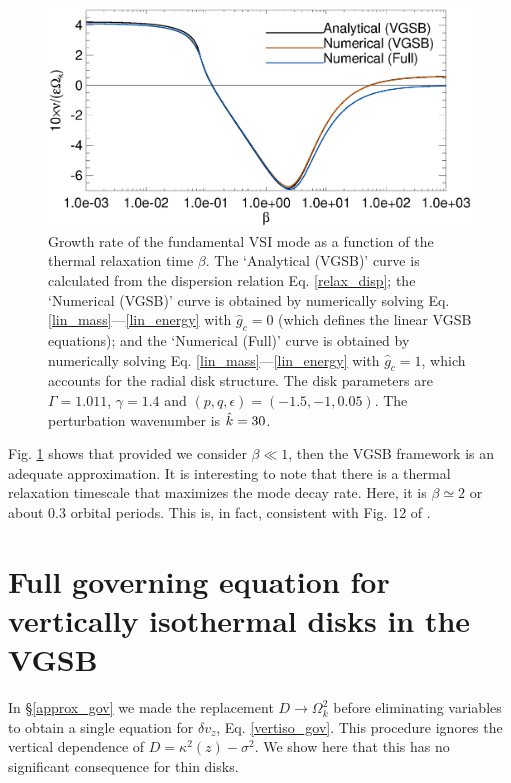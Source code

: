 \begin{figure}
  \includegraphics[width=\linewidth,clip=true,trim=0cm 0.0cm 0cm
  0cm]{figures/gcorr_compare} 
  \caption{Growth rate of the fundamental VSI mode as a function of
    the thermal relaxation time $\beta$. The `Analytical (VGSB)' curve
    is calculated from the dispersion relation Eq. \ref{relax_disp};
    the `Numerical (VGSB)' curve is obtained by numerically solving
    Eq. \ref{lin_mass}---\ref{lin_energy} with $\hat{g}_c=0$
    (which defines the linear VGSB equations); and the `Numerical
    (Full)' curve is obtained by numerically solving
    Eq. \ref{lin_mass}---\ref{lin_energy}  with $\hat{g}_c=1$, which
    accounts for the radial disk structure.  
    The disk parameters are $\Gamma=1.011$,
    $\gamma=1.4$ and $(p,q,\epsilon)=(-1.5,-1,0.05)$. The perturbation
    wavenumber is $\hat{k}=30$. 
    \label{gcorr_compare}}  
\end{figure}

Fig. \ref{gcorr_compare} shows that provided we consider $\beta\ll1$,
then the VGSB framework is an adequate approximation. It is
interesting to note that there is a thermal relaxation timescale that
maximizes the mode decay rate. Here, it is $\beta\simeq2$ or about
$0.3$ orbital periods. This is, in fact, consistent with Fig. 12 of
\cite{nelson13}.  







\section{Full governing equation for vertically isothermal disks in
  the VGSB}\label{adia_improve}
In \S\ref{approx_gov} we made the replacement $D\to\Omega_k^2$ before
eliminating variables to obtain a single equation for $\delta v_z$,
Eq. \ref{vertiso_gov}.  This procedure ignores the vertical dependence of
$D=\kappa^2(z) - \sigma^2$. We show here that this has no significant
consequence for thin disks. 

